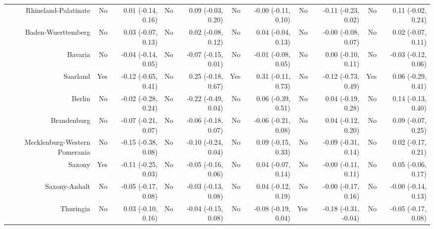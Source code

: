\documentclass[
  man,floatsintext]{apa6}
\newenvironment{lltable}{\begin{landscape}\centering\begin{ThreePartTable}}{\end{ThreePartTable}\end{landscape}}
\begin{document}
\begin{lltable}
{\begin{longtable}{rrrrrrrrrrr}
Rhineland-Palatinate & No & 0.01 (-0.14, 0.16) & No & 0.09 (-0.03, 0.20) & No & -0.00 (-0.11, 0.10) & No & -0.11 (-0.23, 0.02) & No & 0.11 (-0.02, 0.24)\\
Baden-Wuerttemberg & No & 0.03 (-0.07, 0.13) & No & 0.02 (-0.08, 0.12) & No & 0.04 (-0.04, 0.13) & No & -0.00 (-0.08, 0.07) & No & 0.02 (-0.07, 0.11)\\
Bavaria & No & -0.04 (-0.14, 0.05) & No & -0.07 (-0.15, 0.01) & No & -0.01 (-0.08, 0.05) & No & 0.00 (-0.10, 0.11) & No & -0.03 (-0.12, 0.06)\\
Saarland & Yes & -0.12 (-0.65, 0.41) & No & 0.25 (-0.18, 0.67) & Yes & 0.31 (-0.11, 0.73) & No & -0.12 (-0.73, 0.49) & Yes & 0.06 (-0.29, 0.41)\\
Berlin & No & -0.02 (-0.28, 0.24) & No & -0.22 (-0.49, 0.04) & No & 0.06 (-0.39, 0.51) & No & 0.04 (-0.19, 0.28) & No & 0.14 (-0.13, 0.40)\\
Brandenburg & No & -0.07 (-0.21, 0.07) & No & -0.06 (-0.18, 0.07) & No & -0.06 (-0.21, 0.08) & No & 0.04 (-0.12, 0.20) & No & 0.09 (-0.07, 0.25)\\
Mecklenburg-Western Pomerania & No & -0.15 (-0.38, 0.08) & No & -0.10 (-0.24, 0.04) & No & 0.09 (-0.15, 0.33) & No & -0.09 (-0.31, 0.14) & No & 0.02 (-0.17, 0.21)\\
Saxony & Yes & -0.11 (-0.25, 0.03) & No & -0.05 (-0.16, 0.06) & No & 0.04 (-0.07, 0.14) & No & -0.00 (-0.11, 0.11) & No & 0.05 (-0.06, 0.17)\\
Saxony-Anhalt & No & -0.05 (-0.17, 0.08) & No & -0.03 (-0.13, 0.08) & No & 0.04 (-0.12, 0.19) & No & -0.00 (-0.17, 0.16) & No & -0.00 (-0.14, 0.13)\\
Thuringia & No & 0.03 (-0.10, 0.16) & No & -0.04 (-0.15, 0.08) & No & -0.08 (-0.19, 0.04) & Yes & -0.18 (-0.31, -0.04) & No & -0.05 (-0.17, 0.08)\\
\bottomrule
\end{longtable}

}

\end{lltable}
\end{document}
